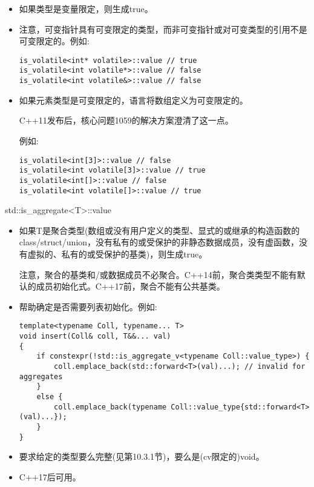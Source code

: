 \begin{itemize}
\item 
如果类型是变量限定，则生成true。

\item 
注意，可变指针具有可变限定的类型，而非可变指针或对可变类型的引用不是可变限定的。例如:

\begin{lstlisting}[style=styleCXX]
is_volatile<int* volatile>::value // true
is_volatile<int volatile*>::value // false
is_volatile<int volatile&>::value // false
\end{lstlisting}

\item 
如果元素类型是可变限定的，语言将数组定义为可变限定的。

\begin{tcolorbox}[colback=webgreen!5!white,colframe=webgreen!75!black]
\hspace*{0.75cm}C++11发布后，核心问题1059的解决方案澄清了这一点。
\end{tcolorbox}

例如:
\begin{lstlisting}[style=styleCXX]
is_volatile<int[3]>::value // false
is_volatile<int volatile[3]>::value // true
is_volatile<int[]>::value // false
is_volatile<int volatile[]>::value // true
\end{lstlisting}
\end{itemize}

std::is\_aggregate<T>::value

\begin{itemize}
\item 
如果T是聚合类型(数组或没有用户定义的类型、显式的或继承的构造函数的class/struct/union，没有私有的或受保护的非静态数据成员，没有虚函数，没有虚拟的、私有的或受保护的基类)，则生成true。

\begin{tcolorbox}[colback=webgreen!5!white,colframe=webgreen!75!black]
\hspace*{0.75cm}注意，聚合的基类和/或数据成员不必聚合。C++14前，聚合类类型不能有默认的成员初始化式。C++17前，聚合不能有公共基类。
\end{tcolorbox}

\item 
帮助确定是否需要列表初始化。例如:
\begin{lstlisting}[style=styleCXX]
template<typename Coll, typename... T>
void insert(Coll& coll, T&&... val)
{
	if constexpr(!std::is_aggregate_v<typename Coll::value_type>) {
		coll.emplace_back(std::forward<T>(val)...); // invalid for aggregates
	}
	else {
		coll.emplace_back(typename Coll::value_type{std::forward<T>(val)...});
	}
}
\end{lstlisting}

\item 
要求给定的类型要么完整(见第10.3.1节)，要么是(cv限定的)void。

\item 
C++17后可用。
\end{itemize}

